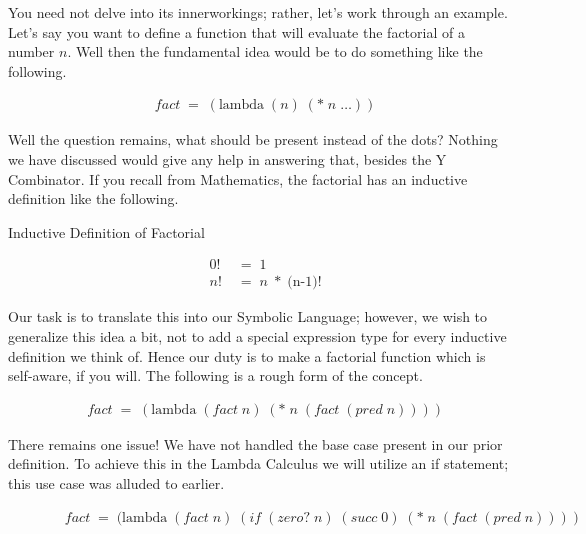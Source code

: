 You need not delve into its innerworkings; rather, let's work through an example. 
Let's say you want to define a function that will evaluate the factorial of a 
number $n$. Well then the fundamental idea would be to do something like the 
following.

\begin{figure}[ht]
\caption{}\label{scheme}
\begin{align*}
& fact \; = \; (\text{lambda} \; (n) \; (* \; n \; \dots))
\end{align*}
\end{figure}

Well the question remains, what should be present instead of the dots? Nothing we 
have discussed would give any help in answering that, besides the Y Combinator. If 
you recall from Mathematics, the factorial has an inductive definition like the 
following.

Inductive Definition of Factorial
\begin{figure}[ht]
\caption{}\label{scheme}
\begin{align*}
& 0! \; &= \; 1
\\& n! \; &= \; n \; * \; (\text{n-1)!}
\end{align*}
\end{figure}

Our task is to translate this into our Symbolic Language; however, we wish to 
generalize this idea a bit, not to add a special expression type for every 
inductive definition we think of. Hence our duty is to make a factorial function 
which is self-aware, if you will. The following is a rough form of the concept.

\begin{figure}[ht]
\caption{}\label{scheme}
\begin{align*}
& fact \; = \; (\text{lambda} \; (fact \; n) \; (* \; n \; (fact \; (pred \; n))))
\end{align*}
\end{figure}

There remains one issue! We have not handled the base case present in our prior 
definition. To achieve this in the Lambda Calculus we will utilize an if 
statement; this use case was alluded to earlier.

\begin{figure}[ht]
\caption{}\label{scheme}
\begin{align*}
& fact \; = \; (\text{lambda} \; (fact \; n) \; (if \; (zero? \; n) \; (succ \; 0) \; (* \; n \; (fact \; (pred \; n))))
\end{align*}
\end{figure}

